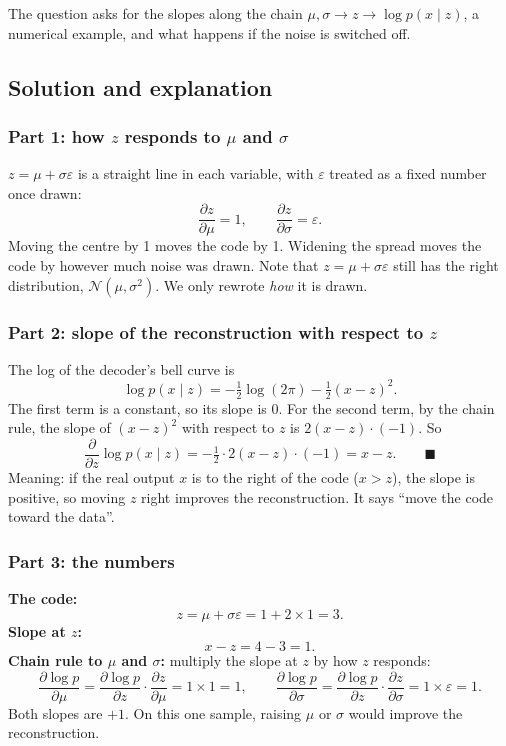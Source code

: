 \documentclass[12pt,a4paper]{article}
\begin{document}
The question asks for the slopes along the chain $\mu, \sigma \to z \to \log p(x \mid z)$, a numerical example, and what happens if the noise is switched off.

\subsection{Solution and explanation}

\subsubsection{Part 1: how $z$ responds to $\mu$ and $\sigma$}

$z = \mu + \sigma\varepsilon$ is a straight line in each variable, with $\varepsilon$ treated as a fixed number once drawn:
\[
\frac{\partial z}{\partial \mu} = 1, \qquad \frac{\partial z}{\partial \sigma} = \varepsilon.
\]
Moving the centre by 1 moves the code by 1. Widening the spread moves the code by however much noise was drawn. Note that $z = \mu + \sigma\varepsilon$ still has the right distribution, $\mathcal{N}(\mu,\sigma^2)$. We only rewrote \emph{how} it is drawn.

\subsubsection{Part 2: slope of the reconstruction with respect to $z$}

The log of the decoder's bell curve is
\[
\log p(x \mid z) = -\tfrac{1}{2}\log(2\pi) - \tfrac{1}{2}(x - z)^2.
\]
The first term is a constant, so its slope is 0. For the second term, by the chain rule, the slope of $(x-z)^2$ with respect to $z$ is $2(x - z)\cdot(-1)$. So
\[
\frac{\partial}{\partial z}\log p(x \mid z) = -\tfrac{1}{2}\cdot 2(x - z)\cdot(-1) = x - z. \qquad \blacksquare
\]
Meaning: if the real output $x$ is to the right of the code ($x > z$), the slope is positive, so moving $z$ right improves the reconstruction. It says ``move the code toward the data''.

\subsubsection{Part 3: the numbers}

\textbf{The code:}
\[
z = \mu + \sigma\varepsilon = 1 + 2 \times 1 = 3.
\]
\textbf{Slope at $z$:}
\[
x - z = 4 - 3 = 1.
\]
\textbf{Chain rule to $\mu$ and $\sigma$:} multiply the slope at $z$ by how $z$ responds:
\[
\frac{\partial \log p}{\partial \mu} = \frac{\partial \log p}{\partial z}\cdot\frac{\partial z}{\partial \mu} = 1 \times 1 = 1, \qquad
\frac{\partial \log p}{\partial \sigma} = \frac{\partial \log p}{\partial z}\cdot\frac{\partial z}{\partial \sigma} = 1 \times \varepsilon = 1.
\]
Both slopes are $+1$. On this one sample, raising $\mu$ or $\sigma$ would improve the reconstruction.
\end{document}
